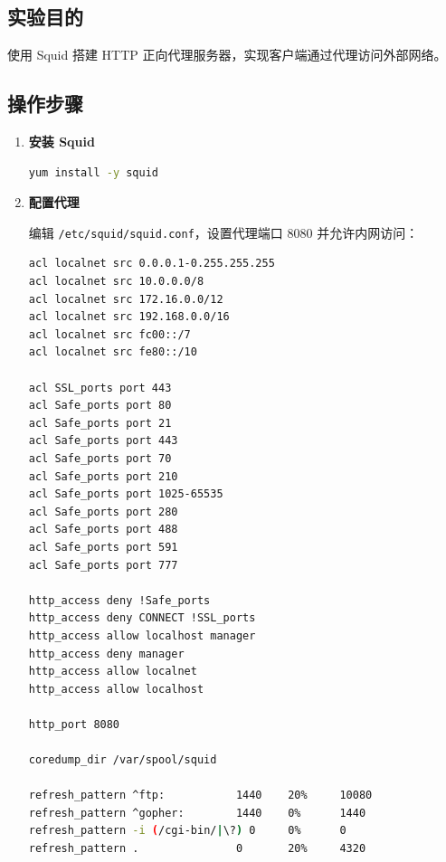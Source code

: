\documentclass[12pt,a4paper]{ctexart}
\begin{document}
\subsection{实验目的}

使用 Squid 搭建 HTTP 正向代理服务器，实现客户端通过代理访问外部网络。

\subsection{操作步骤}

\begin{enumerate}[label=\arabic*.,leftmargin=*]

  \item \textbf{安装 Squid}

  \begin{cmdbox}
  \begin{lstlisting}[language=bash]
yum install -y squid
  \end{lstlisting}
  \end{cmdbox}

  \item \textbf{配置代理}

  编辑 \texttt{/etc/squid/squid.conf}，设置代理端口 8080 并允许内网访问：

  \begin{cmdbox}
  \begin{lstlisting}[language=bash]
acl localnet src 0.0.0.1-0.255.255.255
acl localnet src 10.0.0.0/8
acl localnet src 172.16.0.0/12
acl localnet src 192.168.0.0/16
acl localnet src fc00::/7
acl localnet src fe80::/10

acl SSL_ports port 443
acl Safe_ports port 80
acl Safe_ports port 21
acl Safe_ports port 443
acl Safe_ports port 70
acl Safe_ports port 210
acl Safe_ports port 1025-65535
acl Safe_ports port 280
acl Safe_ports port 488
acl Safe_ports port 591
acl Safe_ports port 777

http_access deny !Safe_ports
http_access deny CONNECT !SSL_ports
http_access allow localhost manager
http_access deny manager
http_access allow localnet
http_access allow localhost

http_port 8080

coredump_dir /var/spool/squid

refresh_pattern ^ftp:           1440    20%     10080
refresh_pattern ^gopher:        1440    0%      1440
refresh_pattern -i (/cgi-bin/|\?) 0     0%      0
refresh_pattern .               0       20%     4320
  \end{lstlisting}
  \end{cmdbox}


\end{enumerate}
\end{document}

